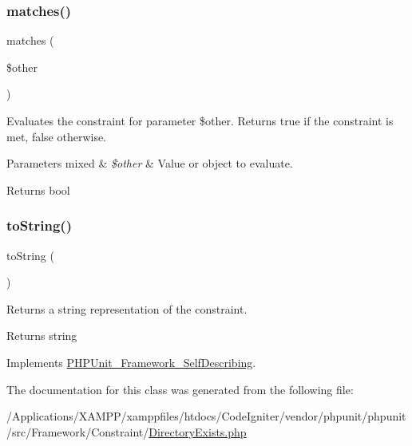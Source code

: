 \subsubsection{\texorpdfstring{matches()}{matches()}}
{\footnotesize\ttfamily matches (\begin{DoxyParamCaption}\item[{}]{\$other }\end{DoxyParamCaption})\hspace{0.3cm}{\ttfamily [protected]}}

Evaluates the constraint for parameter \$other. Returns true if the constraint is met, false otherwise.


\begin{DoxyParams}[1]{Parameters}
mixed & {\em \$other} & Value or object to evaluate.\\
\hline
\end{DoxyParams}
\begin{DoxyReturn}{Returns}
bool 
\end{DoxyReturn}
\mbox{\label{class_p_h_p_unit___framework___constraint___directory_exists_a5558c5d549f41597377fa1ea8a1cefa3}} 
\subsubsection{\texorpdfstring{to\+String()}{toString()}}
{\footnotesize\ttfamily to\+String (\begin{DoxyParamCaption}{ }\end{DoxyParamCaption})}

Returns a string representation of the constraint.

\begin{DoxyReturn}{Returns}
string 
\end{DoxyReturn}


Implements \mbox{\hyperlink{interface_p_h_p_unit___framework___self_describing_a5558c5d549f41597377fa1ea8a1cefa3}{P\+H\+P\+Unit\+\_\+\+Framework\+\_\+\+Self\+Describing}}.



The documentation for this class was generated from the following file\+:\begin{DoxyCompactItemize}
\item 
/\+Applications/\+X\+A\+M\+P\+P/xamppfiles/htdocs/\+Code\+Igniter/vendor/phpunit/phpunit/src/\+Framework/\+Constraint/\mbox{\hyperlink{_directory_exists_8php}{Directory\+Exists.\+php}}\end{DoxyCompactItemize}

